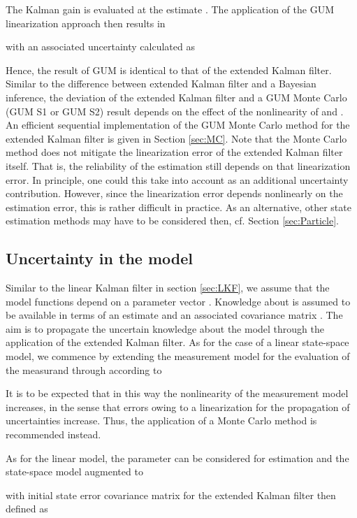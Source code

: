\documentclass[10pt]{article}
\begin{document}
\begin{spacing}{1}
The Kalman gain  is evaluated at the estimate . The application of the GUM linearization approach then results in

with an associated uncertainty calculated as

Hence, the result of GUM is identical to that of the extended Kalman filter. Similar to the difference between extended Kalman filter and a Bayesian inference, the deviation of the extended Kalman filter and a GUM Monte Carlo (GUM S1 or GUM S2) result depends on the effect of the nonlinearity of  and . An efficient sequential implementation of the GUM Monte Carlo method for the extended Kalman filter is given in Section \ref{sec:MC}. Note that the Monte Carlo method does not mitigate the linearization error of the extended Kalman filter itself. That is, the reliability of the estimation still depends on that linearization error. In principle, one could this take into account as an additional uncertainty contribution. However, since the linearization error depends nonlinearly on the estimation error, this is rather difficult in practice. As an alternative, other state estimation methods may have to be considered then, cf. Section \ref{sec:Particle}.


\subsection{Uncertainty in the model}
Similar to the linear Kalman filter in section \ref{sec:LKF}, we assume that the model functions depend on a parameter vector . Knowledge about  is assumed to be available in terms of an estimate  and an associated covariance matrix . The aim is to propagate the uncertain knowledge about the model through the application of the extended Kalman filter. As for the case of a linear state-space model, we commence by extending the measurement model for the evaluation of the measurand through  according to
 
It is to be expected that in this way the nonlinearity of the measurement model increases, in the sense that errors owing to a linearization for the propagation of uncertainties increase. Thus, the application of a Monte Carlo method is recommended instead. 

As for the linear model, the parameter  can be considered for estimation and the state-space model augmented to 

with initial state error covariance matrix for the extended Kalman filter then defined as


\end{spacing}
\end{document}
